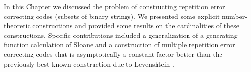 In this Chapter we discussed the problem of constructing
repetition error correcting codes (subsets of binary strings). We
presented some explicit number-theoretic constructions and
provided some results on the cardinalities of these constructions.
Specific contributions included a generalization of a generating
function calculation of Sloane \cite{sloane:00} and a construction
of multiple repetition error correcting codes that is
asymptotically a constant factor better than the previously best
known construction due to Levenshtein \cite{lev:66a}.


